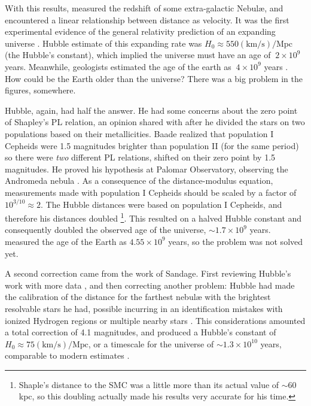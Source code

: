 
With this results, \cite{Hubble1929} measured the redshift of some extra-galactic Nebul\ae{}, 
and encountered a linear relationship between distance as velocity.
It was the first experimental evidence of the general relativity prediction of an expanding universe \citep{Fiedmann1922,Lemaitre1927}.
Hubble estimate of this expanding rate was $H_0 \approx 550 (\text{km}/\text{s})/\text{Mpc}$ (the Hubble's constant), 
which implied the universe must have an age of $~2\times10^9$ years. 
Meanwhile, geologists estimated the age of the earth as $~4\times10^9$ years \citep[for an historical account see]{Dalrymple1994}.
How could be the Earth older than the universe? There was a big problem in the figures, somewhere.


Hubble, again, had half the answer. He had some concerns about the zero point of Shapley's PL relation, 
an opinion shared with \cite{Baade1944} after he divided the stars on two populations based on their metallicities.
Baade realized that population I Cepheids were 1.5 magnitudes brighter than population II (for the same period) 
so there were \textit{two} different PL relations, shifted on their zero point by 1.5 magnitudes.
He proved his hypothesis at Palomar Observatory, observing the Andromeda nebula \citep{Baade1956,Arp1955}.
As a consequence of the distance-modulus equation, measurements made with population I Cepheids should be scaled by a factor of $10^{3/10}\approx 2$.
The Hubble distances were based on population I Cepheids, and  therefore his distances doubled
\footnote{Shaple's distance to the SMC was a little more than its actual value of $\sim 60$ kpc, so this doubling actually made his results very accurate for his time.}. 
This resulted on a halved Hubble constant and consequently doubled the observed age of the universe, $\sim1.7\times 10^9$ years.
\cite{Patterson1955} measured the age of the Earth as $4.55\times10^9$ years, so the problem was not solved yet.


A second correction came from the work of Sandage. 
First reviewing Hubble's work with more data \citep{Sandage1956}, and then correcting another problem:
Hubble had made the calibration of the distance for the farthest nebul\ae{} with the brightest resolvable stars he had,
possible incurring in an identification mistakes with ionized Hydrogen regions or multiple nearby stars \citep{Sandage1958}.
This considerations amounted a total correction of 4.1 magnitudes, 
and produced a Hubble's constant of $H_0 \approx 75 (\text{km}/\text{s})/\text{Mpc}$, 
or a timescale for the universe of $\sim1.3\times 10^{10}$ years, comparable to modern estimates \citep{Freedman2001}.

